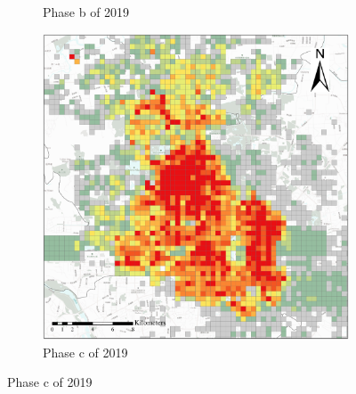 \documentclass[preprints,ijgi,submit,moreauthors]{Definitions/mdpi}
\begin{document}
\begin{figure}[ht]
\begin{subfigure}{.3\textwidth}
        \caption{Phase b of 2019}
    \end{subfigure}
    \begin{subfigure}{.3\textwidth}
        \includegraphics[width=\textwidth]{Figures/BSSPhase3_2019.eps}
        \caption{Phase c of 2019}
    \end{subfigure}
    

\end{figure}
\end{document}
